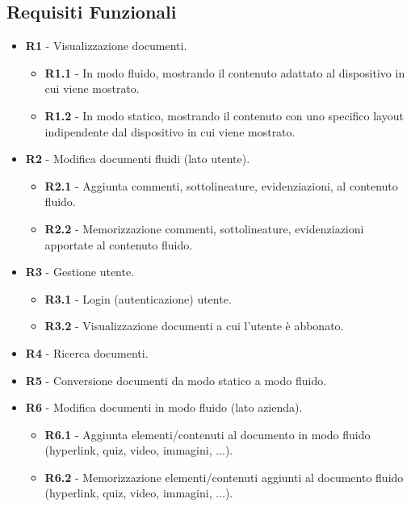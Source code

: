 \subsection{Requisiti Funzionali}
\begin{itemize}
    \item \textbf{R1} - Visualizzazione documenti.
    \begin{itemize}
        \item \textbf{R1.1} - In modo fluido, mostrando il contenuto adattato al dispositivo in cui viene mostrato.
        \item \textbf{R1.2} - In modo statico, mostrando il contenuto con uno specifico layout indipendente dal dispositivo in cui viene mostrato.
    \end{itemize}
    \item \textbf{R2} - Modifica documenti fluidi (lato utente).
    \begin{itemize}
        \item \textbf{R2.1} - Aggiunta commenti, sottolineature, evidenziazioni, al contenuto fluido.
        \item \textbf{R2.2} - Memorizzazione commenti, sottolineature, evidenziazioni apportate al contenuto fluido.
    \end{itemize}
    \item \textbf{R3} - Gestione utente.
    \begin{itemize}
        \item \textbf{R3.1} - Login (autenticazione) utente.
        \item \textbf{R3.2} - Visualizzazione documenti a cui l'utente è abbonato.
    \end{itemize}
    \item \textbf{R4} - Ricerca documenti.
    \item \textbf{R5} - Conversione documenti da modo statico a modo fluido.
    \item \textbf{R6} - Modifica documenti in modo fluido (lato azienda).
    \begin{itemize}
        \item \textbf{R6.1} - Aggiunta elementi/contenuti al documento in modo fluido (hyperlink, quiz, video, immagini, ...).
        \item \textbf{R6.2} - Memorizzazione elementi/contenuti aggiunti al documento fluido (hyperlink, quiz, video, immagini, ...).
    \end{itemize}
\end{itemize}

